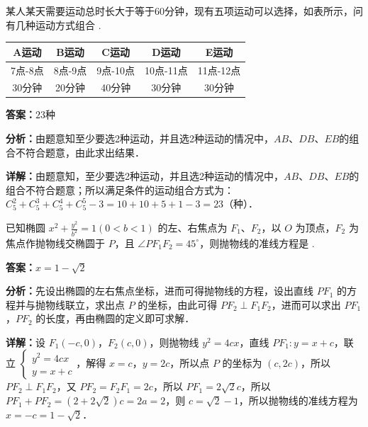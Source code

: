 \begin{question}[points=5]
某人某天需要运动总时长大于等于60分钟，现有五项运动可以选择，如表所示，问有几种运动方式组合  .\begin{center}\begin{tabular}{|c|c|c|c|c|} \hline A运动 & B运动 & C运动 & D运动 & E运动 \\ \hline 7点-8点 & 8点-9点 & 9点-10点 & 10点-11点 & 11点-12点 \\ \hline 30分钟 & 20分钟 & 40分钟 & 30分钟 & 30分钟 \\ \hline \end{tabular}\end{center}
\fillin[{$23$种}]
\begin{solution}
\textbf{答案：}$23$种

\textbf{分析：}由题意知至少要选2种运动，并且选2种运动的情况中，$AB$、$DB$、$EB$的组合不符合题意，由此求出结果．

\textbf{详解：}由题意知，至少要选2种运动，并且选2种运动的情况中，$AB$、$DB$、$EB$的组合不符合题意；所以满足条件的运动组合方式为：$C_5^2+C_5^3+C_5^4+C_5^5-3=10+10+5+1-3=23$（种）．
\end{solution}
\end{question}

\begin{question}[points=5]
已知椭圆 $x^2+\frac{y^2}{b^2}=1(0<b<1)$ 的左、右焦点为 $F_1$、$F_2$，以 $O$ 为顶点，$F_2$ 为焦点作抛物线交椭圆于 $P$，且 $\angle PF_1F_2=45^\circ$，则抛物线的准线方程是  .
\fillin[{$x=1-\sqrt{2}$}]
\begin{solution}
\textbf{答案：}$x=1-\sqrt{2}$

\textbf{分析：}先设出椭圆的左右焦点坐标，进而可得抛物线的方程，设出直线 $PF_1$ 的方程并与抛物线联立，求出点 $P$ 的坐标，由此可得 $PF_2\perp F_1F_2$，进而可以求出 $PF_1$，$PF_2$ 的长度，再由椭圆的定义即可求解．

\textbf{详解：}设 $F_1(-c,0)$，$F_2(c,0)$，则抛物线 $y^2=4cx$，直线 $PF_1:y=x+c$，联立 $\begin{cases} y^2=4cx \\ y=x+c \end{cases}$，解得 $x=c$，$y=2c$，所以点 $P$ 的坐标为 $(c,2c)$，所以 $PF_2\perp F_1F_2$，又 $PF_2=F_2F_1=2c$，所以 $PF_1=2\sqrt{2}c$，所以 $PF_1+PF_2=(2+2\sqrt{2})c=2a=2$，则 $c=\sqrt{2}-1$，所以抛物线的准线方程为 $x=-c=1-\sqrt{2}$．
\end{solution}
\end{question}


